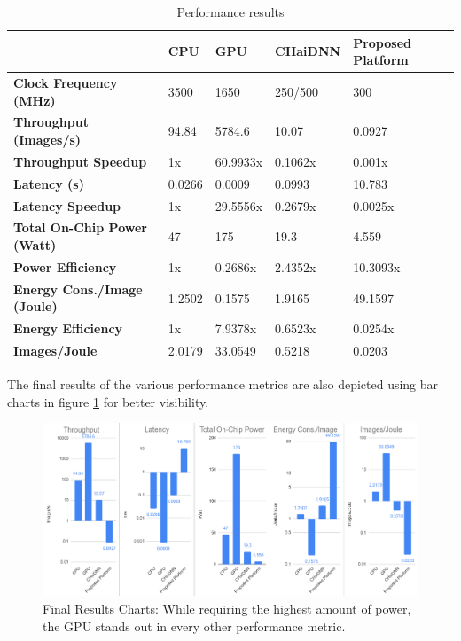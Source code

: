 \begin{table}[H]
	\caption{Performance results}
	\label{tab:Performance-results}
	\centering
	\begin{tabular}{l|l|l|l|p{2cm}}
		\toprule
		& \textbf{CPU} & \textbf{GPU} & \textbf{CHaiDNN} & \textbf{Proposed Platform}\\
		\midrule
			\textbf{Clock Frequency (MHz)} & 3500 & 1650 & 250/500 & 300\\
			\textbf{Throughput (Images/s)} & 94.84 & 5784.6 & 10.07 & 0.0927\\
			\textbf{Throughput Speedup} & 1x & 60.9933x & 0.1062x & 0.001x\\
			\textbf{Latency (s)} & 0.0266 & 0.0009 & 0.0993 & 10.783\\
			\textbf{Latency Speedup} & 1x & 29.5556x & 0.2679x & 0.0025x\\
			\textbf{Total On-Chip Power (Watt)} & 47 & 175 & 19.3 & 4.559\\
			\textbf{Power Efficiency} & 1x & 0.2686x & 2.4352x & 10.3093x\\
			\textbf{Energy Cons./Image (Joule)} & 1.2502 & 0.1575 & 1.9165 & 49.1597\\
			\textbf{Energy Efficiency} & 1x & 7.9378x & 0.6523x & 0.0254x\\
			\textbf{Images/Joule} & 2.0179 & 33.0549 & 0.5218 & 0.0203\\
		\bottomrule
	\end{tabular}
\end{table}

The final results of the various performance metrics are also depicted using bar charts in figure \ref{fig:Final-Results-charts} for better visibility.

\begin{figure} [H]
	\centering
	\includegraphics[width=\textwidth]{Images/Results/Final-Results-charts.png}
	\decoRule
	\caption[Final Results Charts]{Final Results Charts: While requiring the highest amount of power, the GPU stands out in every other performance metric.}
	\label{fig:Final-Results-charts}
\end{figure}

